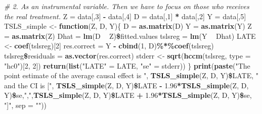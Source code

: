 \documentclass[]{article}
\newenvironment{Shaded}{\begin{snugshade}}{\end{snugshade}}
\newcommand{\KeywordTok}[1]{\textcolor[rgb]{0.13,0.29,0.53}{\textbf{#1}}}
\newcommand{\DataTypeTok}[1]{\textcolor[rgb]{0.13,0.29,0.53}{#1}}
\newcommand{\DecValTok}[1]{\textcolor[rgb]{0.00,0.00,0.81}{#1}}
\newcommand{\FloatTok}[1]{\textcolor[rgb]{0.00,0.00,0.81}{#1}}
\newcommand{\StringTok}[1]{\textcolor[rgb]{0.31,0.60,0.02}{#1}}
\newcommand{\CommentTok}[1]{\textcolor[rgb]{0.56,0.35,0.01}{\textit{#1}}}
\newcommand{\ControlFlowTok}[1]{\textcolor[rgb]{0.13,0.29,0.53}{\textbf{#1}}}
\newcommand{\OperatorTok}[1]{\textcolor[rgb]{0.81,0.36,0.00}{\textbf{#1}}}
\newcommand{\NormalTok}[1]{#1}
\begin{document}
\begin{Shaded}
\begin{Highlighting}[]
\CommentTok{# 2. As an instrumental variable. Then we have to focus on those who receives the real treatment.}
\NormalTok{Z =}\StringTok{ }\NormalTok{data[,}\DecValTok{3}\NormalTok{] }\OperatorTok{-}\StringTok{ }\NormalTok{data[,}\DecValTok{4}\NormalTok{]}
\NormalTok{D =}\StringTok{ }\NormalTok{data[,}\DecValTok{1}\NormalTok{] }\OperatorTok{*}\StringTok{ }\NormalTok{data[,}\DecValTok{2}\NormalTok{]}
\NormalTok{Y =}\StringTok{ }\NormalTok{data[,}\DecValTok{5}\NormalTok{]}
\NormalTok{TSLS_simple <-}\StringTok{ }\ControlFlowTok{function}\NormalTok{(Z, D, Y)\{}
\NormalTok{  D =}\StringTok{ }\KeywordTok{as.matrix}\NormalTok{(D)}
\NormalTok{  Y =}\StringTok{ }\KeywordTok{as.matrix}\NormalTok{(Y)}
\NormalTok{  Z =}\StringTok{ }\KeywordTok{as.matrix}\NormalTok{(Z)}
\NormalTok{  Dhat    =}\StringTok{ }\KeywordTok{lm}\NormalTok{(D }\OperatorTok{~}\StringTok{ }\NormalTok{Z)}\OperatorTok{\$}\NormalTok{fitted.values}
\NormalTok{  tslsreg =}\StringTok{ }\KeywordTok{lm}\NormalTok{(Y }\OperatorTok{~}\StringTok{ }\NormalTok{Dhat)}
\NormalTok{  LATE <-}\StringTok{ }\KeywordTok{coef}\NormalTok{(tslsreg)[}\DecValTok{2}\NormalTok{]}
\NormalTok{  res.correct       =}\StringTok{ }\NormalTok{Y }\OperatorTok{-}\StringTok{ }\KeywordTok{cbind}\NormalTok{(}\DecValTok{1}\NormalTok{, D)}\OperatorTok{\%*\%}\KeywordTok{coef}\NormalTok{(tslsreg)}
\NormalTok{  tslsreg}\OperatorTok{\$}\NormalTok{residuals =}\StringTok{ }\KeywordTok{as.vector}\NormalTok{(res.correct)}
\NormalTok{  stderr <-}\StringTok{ }\KeywordTok{sqrt}\NormalTok{(}\KeywordTok{hccm}\NormalTok{(tslsreg, }\DataTypeTok{type =} \StringTok{"hc0"}\NormalTok{)[}\DecValTok{2}\NormalTok{, }\DecValTok{2}\NormalTok{])}
  \KeywordTok{return}\NormalTok{(}\KeywordTok{list}\NormalTok{(}\StringTok{"LATE"}\NormalTok{ =}\StringTok{ }\NormalTok{LATE, }\StringTok{"se"}\NormalTok{ =}\StringTok{ }\NormalTok{stderr))}
\NormalTok{\}}
\KeywordTok{print}\NormalTok{(}\KeywordTok{paste}\NormalTok{(}\StringTok{"The point estimate of the average causal effect is "}\NormalTok{, }\KeywordTok{TSLS_simple}\NormalTok{(Z, D, Y)}\OperatorTok{\$}\NormalTok{LATE, }\StringTok{" and the CI is ["}\NormalTok{, }\KeywordTok{TSLS_simple}\NormalTok{(Z, D, Y)}\OperatorTok{\$}\NormalTok{LATE }\OperatorTok{-}\StringTok{ }\FloatTok{1.96}\OperatorTok{*}\KeywordTok{TSLS_simple}\NormalTok{(Z, D, Y)}\OperatorTok{\$}\NormalTok{se,}\StringTok{","}\NormalTok{,}\KeywordTok{TSLS_simple}\NormalTok{(Z, D, Y)}\OperatorTok{\$}\NormalTok{LATE }\OperatorTok{+}\StringTok{ }\FloatTok{1.96}\OperatorTok{*}\KeywordTok{TSLS_simple}\NormalTok{(Z, D, Y)}\OperatorTok{\$}\NormalTok{se, }\StringTok{"]"}\NormalTok{, }\DataTypeTok{sep =} \StringTok{""}\NormalTok{))}
\end{Highlighting}
\end{Shaded}
\end{document}
